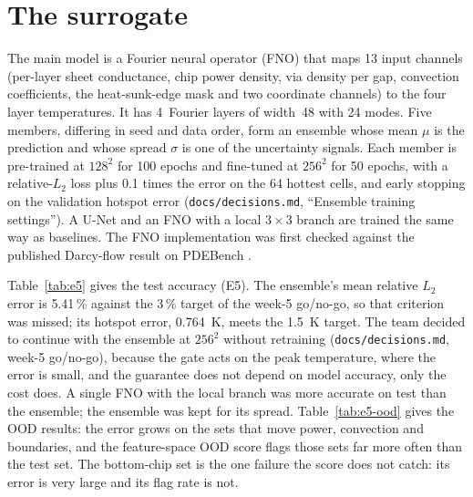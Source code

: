 \section{The surrogate}
\label{sec:dl-surrogate}
The main model is a Fourier neural operator (FNO) \cite{li2021fno} that maps 13 input channels
(per-layer sheet conductance, chip power density, via density per gap, convection coefficients,
the heat-sunk-edge mask and two coordinate channels) to the four layer temperatures. It has
4~Fourier layers of width~48 with 24 modes. Five members, differing in seed and data order,
form an ensemble whose mean $\mu$ is the prediction and whose spread $\sigma$ is one of the
uncertainty signals. Each member is pre-trained at $128^2$ for 100 epochs and fine-tuned at
$256^2$ for 50 epochs, with a relative-$L_2$ loss plus 0.1 times the error on the 64 hottest
cells, and early stopping on the validation hotspot error (\texttt{docs/decisions.md},
``Ensemble training settings''). A U-Net and an FNO with a local $3\times3$ branch are trained
the same way as baselines. The FNO implementation was first checked against the published
Darcy-flow result on PDEBench \cite{pdebench2022}.

Table~\ref{tab:e5} gives the test accuracy (E5). The ensemble's mean relative $L_2$ error is
5.41\,\% %
against the 3\,\% target of the week-5 go/no-go, so that criterion was missed; its hotspot error,
0.764~K, %
meets the 1.5~K target. The team decided to continue with the ensemble at $256^2$ without
retraining (\texttt{docs/decisions.md}, week-5 go/no-go), because the gate acts on the peak
temperature, where the error is small, and the guarantee does not depend on model accuracy, only
the cost does. A single FNO with the local branch was more accurate on test than the ensemble;
the ensemble was kept for its spread. Table~\ref{tab:e5-ood} gives the OOD results: the error
grows on the sets that move power, convection and boundaries, and the feature-space OOD score
flags those sets far more often than the test set. The bottom-chip set is the one failure the
score does not catch: its error is very large and its flag rate is not.

\begin{table}[t]\centering\small

\caption{E5 surrogate accuracy on the test split and the OOD sets (tag of the E5 run:
\texttt{experiments/results/e5/run\_info.json}). Top: models; bottom: the ensemble per split, with
the rate at which the OOD score flags a board.}
\label{tab:e5}\label{tab:e5-ood}
\end{table}

